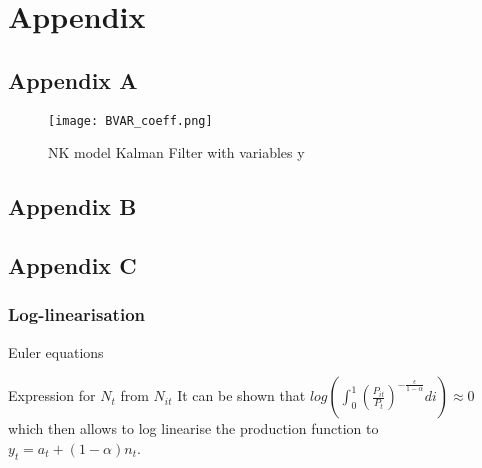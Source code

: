 \documentclass[12pt,a4paper,english]{article} %
\let\oldsection\section
\renewcommand\section{\clearpage\oldsection}
\begin{document}
	
	
	
	\section*{Appendix}
	
	\pagebreak
	\subsection*{Appendix A} \label{appa}
	

	
	
	
	


	\begin{figure}
		\begin{center}
			\texttt{[image: BVAR\_coeff.png]}
			\caption{NK model Kalman Filter with variables y}\label{fig:bvar_coef}
		\end{center}
	\end{figure}


	
	\pagebreak
	\subsection*{Appendix B} \label{appb}
	

	
	
	\pagebreak
	\subsection*{Appendix C} \label{appc}
	\subsubsection*{Log-linearisation}
	
	Euler equations
	
	Expression for $N_t$ from $N_{it}$
	It can be shown that $ log \left( \int_{0}^{1} \left( \frac{P_{it}}{P_t} \right)^{-\frac{\epsilon}{1 - \alpha}} di \right) \approx 0$ which then allows to log linearise the production function to $y_t = a_t + (1 - \alpha) n_t$.
	
\end{document}
